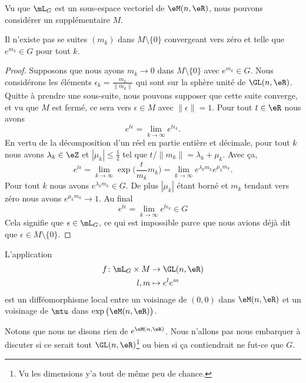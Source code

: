 Vu que \( \mL_G\) est un sous-espace vectoriel de \( \eM(n,\eR)\), nous pouvons considérer un supplémentaire \( M\).

\begin{lemma}   \label{LemHOsbREC}
    Il n'existe pas se suites \( (m_k)\) dans \( M\setminus\{ 0 \}\) convergeant vers zéro et telle que \(  e^{m_k}\in G\) pour tout \( k\).
\end{lemma}

\begin{proof}
    Supposons que nous ayons \( m_k\to 0\) dans \( M\setminus\{ 0 \}\) avec \(  e^{m_k}\in G\). Nous considérons les éléments \( \epsilon_k=\frac{ m_k }{ \| m_k \| }\) qui sont sur la sphère unité de \(\GL(n,\eR)\). Quitte à prendre une sous-suite, nous pouvons supposer que cette suite converge, et vu que \( M\) est fermé, ce sera vers \( \epsilon\in M\) avec \( \| \epsilon \|=1\). Pour tout \( t\in \eR\) nous avons
    \begin{equation}
        e^{t\epsilon}=\lim_{k\to \infty}  e^{t\epsilon_k}.
    \end{equation}
    En vertu de la décomposition d'un réel en partie entière et décimale, pour tout \( k\) nous avons \( \lambda_k\in \eZ\) et \( | \mu_k |\leq \frac{ 1 }{2}\) tel que \( t/\| m_k \|=\lambda_k+\mu_k\). Avec ça,
    \begin{equation}
        e^{t\epsilon}=\lim_{k\to \infty}\exp\Big( \frac{ t }{ m_k }m_k \Big)=\lim_{k\to \infty}  e^{\lambda_km_k} e^{\mu_km_k}.
    \end{equation}
    Pour tout \( k\) nous avons \(  e^{\lambda_km_k}\in G\). De plus \( | \mu_k |\) étant borné et \( m_k\) tendant vers zéro nous avons \(  e^{\mu_km_k}\to 1\). Au final
    \begin{equation}
        e^{t\epsilon}=\lim_{k\to \infty}  e^{t\epsilon_k}\in G
    \end{equation}
    Cela signifie que \( \epsilon\in\mL_G\), ce qui est impossible parce que nous avions déjà dit que \( \epsilon\in M\setminus\{ 0 \}\).
\end{proof}

\begin{lemma}   \label{LemGGTtxdF}
    L'application
    \begin{equation}
        \begin{aligned}
            f\colon \mL_G\times M&\to \GL(n,\eR) \\
            l,m&\mapsto  e^{l} e^{m} 
        \end{aligned}
    \end{equation}
    est un difféomorphisme local entre un voisinage de \( (0,0)\) dans \( \eM(n,\eR)\) et un voisinage de \( \mtu\) dans \( \exp\big( \eM(n,\eR) \big)\).
\end{lemma}
Notons que nous ne disons rien de \(  e^{\eM(n,\eR)}\). Nous n'allons pas nous embarquer à discuter si ce serait tout \( \GL(n,\eR)\)\footnote{Vu les dimensions y'a tout de même peu de chance.} ou bien si ça contiendrait ne fut-ce que \( G\).

